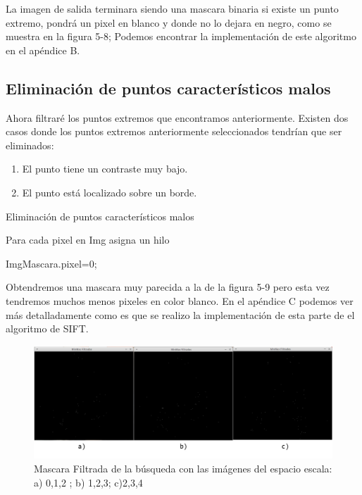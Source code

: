 La imagen de salida terminara siendo una mascara binaria si existe un punto extremo, pondrá un pixel en blanco y donde no lo dejara en negro, como se muestra en la figura 5-8; Podemos encontrar la implementación de este algoritmo en el apéndice B. \pagebreak






\subsection{Eliminación de puntos característicos malos}

Ahora filtraré los puntos extremos que encontramos anteriormente. Existen dos casos donde los puntos extremos anteriormente seleccionados tendrían que ser eliminados:
	\begin{enumerate}
		\item El punto tiene un contraste muy bajo.
		\item El punto está localizado sobre un borde.
	\end{enumerate}		

\begin{algorithm}[H]
\caption{Eliminación de puntos característicos malos}
 Para cada pixel en Img asigna un hilo\;
 
 {
	{
		{
			ImgMascara.pixel=0;
		}
	
				
	}
	
	
		
}
	
\end{algorithm}

Obtendremos una mascara muy parecida a la de la figura 5-9 pero esta vez tendremos muchos menos pixeles en color blanco. En el apéndice C podemos ver más detalladamente como es que se realizo la implementación de esta parte de el algoritmo de SIFT.

\begin{figure}[h]
			\centering
				\includegraphics[scale=0.3]{img/minmax.jpg}
			\caption{Mascara Filtrada de la búsqueda con las imágenes del espacio escala: a) 0,1,2 ; b) 1,2,3; c)2,3,4  }
\end{figure}



